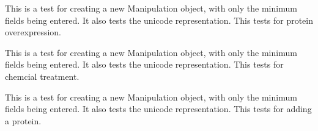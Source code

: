 \documentclass[letterpaper,10pt,english]{sphinxmanual}
\begin{document}
\begin{fulllineitems}
\begin{fulllineitems}
\end{fulllineitems}


\begin{fulllineitems}
\label{api:experimentdb.hypotheses.tests.ManipulationModelTests.test_create_manipulation_minimal_overexpression}
This is a test for creating a new Manipulation object, with only the minimum fields being entered.  It also tests the unicode representation.  This tests for protein overexpression.


\end{fulllineitems}


\begin{fulllineitems}
\label{api:experimentdb.hypotheses.tests.ManipulationModelTests.test_create_manipulation_minimal_treatment_chemical}
This is a test for creating a new Manipulation object, with only the minimum fields being entered.  It also tests the unicode representation.  This tests for chemcial treatment.


\end{fulllineitems}


\begin{fulllineitems}
\label{api:experimentdb.hypotheses.tests.ManipulationModelTests.test_create_manipulation_minimal_treatment_protein_added}
This is a test for creating a new Manipulation object, with only the minimum fields being entered.  It also tests the unicode representation.  This tests for adding a protein.


\end{fulllineitems}


\end{fulllineitems}

\end{document}

